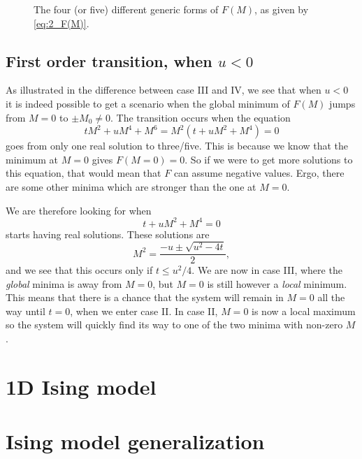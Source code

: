 \documentclass[11pt,letter, swedish, english
]{article}
\newcommand{\Tc}{\ensuremath{T_{\text{c}}}}
\begin{document}

\begin{figure}
\centering

\caption{The four (or five) different generic forms of $F(M)$, as
  given by \eqref{eq:2_F(M)}. }
\label{fig:2a}
\end{figure}

\subsection{First order transition, when $u<0$}
As illustrated in the difference between case III and IV, we see that
when $u<0$ it is indeed possible to get a scenario when the global
minimum of $F(M)$ jumps from $M=0$ to $\pm M_0\neq0$. The transition
occurs when the equation 
\begin{equation}
tM^2+uM^4+M^6=M^2(t+uM^2+M^4)=0
\end{equation}
goes from only one real solution to three/five. This is because we
know that the minimum at $M=0$ gives $F(M=0)=0$. So if we were to get
more solutions to this equation, that would mean that $F$ can assume
negative values. Ergo, there are some other minima which are stronger
than the one at $M=0$. 

We are therefore looking for when
\begin{equation}
t+uM^2+M^4=0
\end{equation}
starts having real solutions. These solutions are
\begin{equation}
M^2=\frac{-u\pm\sqrt{u^2-4t}}{2},
\end{equation}
and we see that this occurs only if $t\le u^2/4$. We are now in case
III, where the \emph{global} minima is away from $M=0$, but $M=0$ is
still however a \emph{local} minimum. This means that there is a
chance that the system will remain in $M=0$ all the way until $t=0$,
when we enter case II. In case II, $M=0$ is now a local maximum so the
system will quickly find its way to one of the two minima with
non-zero $M$. 




\section{1D Ising model}



\section{Ising model generalization}
\end{document}
